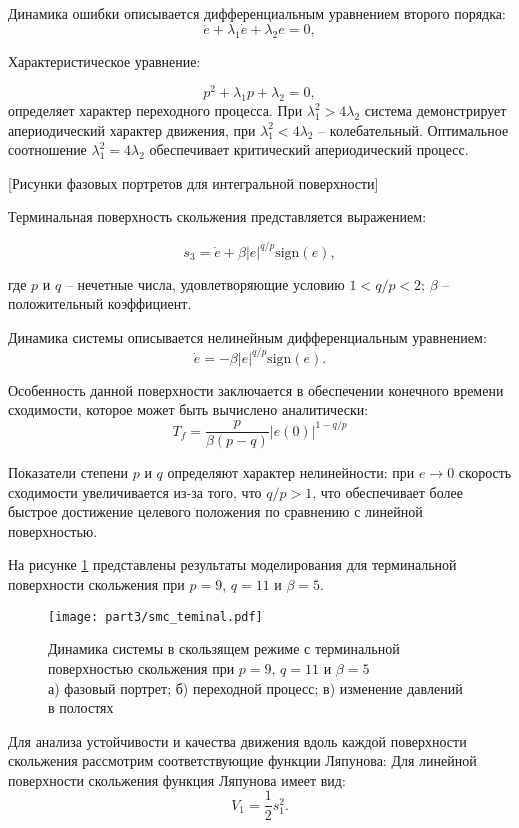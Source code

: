 Динамика ошибки описывается дифференциальным уравнением второго порядка:
$$
	\ddot{e} + \lambda_1 \dot{e} + \lambda_2 e = 0,
$$

Характеристическое уравнение:

$$
	p^2 + \lambda_1 p + \lambda_2 = 0,
$$
определяет характер переходного процесса. При $\lambda_1^2 > 4\lambda_2$ система демонстрирует
апериодический характер движения, при $\lambda_1^2 < 4\lambda_2$ -- колебательный.
Оптимальное соотношение $\lambda_1^2 = 4\lambda_2$ обеспечивает критический апериодический процесс.

[Рисунки фазовых портретов для интегральной поверхности]

Терминальная поверхность скольжения представляется выражением:

$$
	s_3 = \dot{e} + \beta |e|^{q/p} \text{sign}(e),
$$

где $p$ и $q$ -- нечетные числа, удовлетворяющие условию $1 < q/p < 2$;
$\beta$ -- положительный коэффициент.

Динамика системы описывается нелинейным дифференциальным уравнением:
$$
	\dot{e} = -\beta |e|^{q/p} \text{sign}(e).
$$

Особенность данной поверхности заключается в обеспечении конечного
времени сходимости, которое может быть вычислено аналитически:
$$
	T_f = \frac{p}{\beta(p-q)}|e(0)|^{1-q/p}
$$

Показатели степени $p$ и $q$ определяют характер
нелинейности: при $e \to 0$ скорость сходимости
увеличивается из-за того, что $q/p > 1$, что обеспечивает более быстрое достижение
целевого положения по сравнению с линейной поверхностью.

На рисунке \ref{fig:smc_terminal} представлены результаты моделирования для терминальной поверхности скольжения
при $p = 9$, $q = 11$ и $\beta = 5$.

\begin{figure}[ht]
	\centering
	\texttt{[image: part3/smc\_teminal.pdf]}
	\caption{Динамика системы в скользящем режиме с терминальной поверхностью скольжения при $p=9$, $q=11$ и $\beta=5$ \\
		а) фазовый портрет; б) переходной процесс; в) изменение давлений в полостях}
	\label{fig:smc_terminal}
\end{figure}


Для анализа устойчивости и качества движения вдоль каждой поверхности
скольжения рассмотрим соответствующие функции Ляпунова:
Для линейной поверхности скольжения функция Ляпунова имеет вид:
$$
	V_1 = \frac{1}{2}s_1^2.
$$


